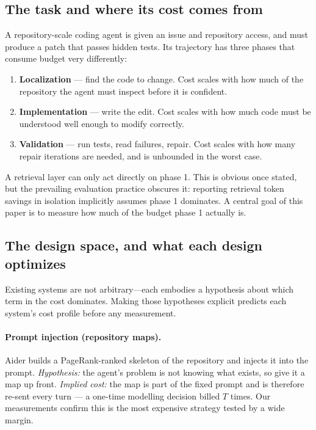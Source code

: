 \documentclass[11pt,letterpaper]{article}
\begin{document}
\subsection{The task and where its cost comes from}
A repository-scale coding agent is given an issue and repository access, and must
produce a patch that passes hidden tests. Its trajectory has three phases that
consume budget very differently:

\begin{enumerate}
\item \textbf{Localization} --- find the code to change. Cost scales with how
much of the repository the agent must inspect before it is confident.
\item \textbf{Implementation} --- write the edit. Cost scales with how much code
must be understood well enough to modify correctly.
\item \textbf{Validation} --- run tests, read failures, repair. Cost scales with
how many repair iterations are needed, and is unbounded in the worst case.
\end{enumerate}

A retrieval layer can only act directly on phase 1. This is obvious once stated,
but the prevailing evaluation practice obscures it: reporting retrieval token
savings in isolation implicitly assumes phase 1 dominates. A central goal of this
paper is to measure how much of the budget phase 1 actually is.

\subsection{The design space, and what each design optimizes}
\label{sec:designspace}
Existing systems are not arbitrary---each embodies a hypothesis about which term
in the cost dominates. Making those hypotheses explicit predicts each system's
cost profile before any measurement.

\paragraph{Prompt injection (repository maps).}
Aider \citep{aider} builds a PageRank-ranked skeleton of the repository and
injects it into the prompt. \emph{Hypothesis:} the agent's problem is not knowing
what exists, so give it a map up front. \emph{Implied cost:} the map is part of
the fixed prompt and is therefore re-sent every turn --- a one-time modelling
decision billed $T$ times. Our measurements confirm this is the most expensive
strategy tested by a wide margin.
\end{document}
